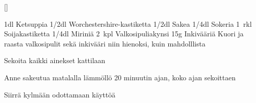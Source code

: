 []

\begin{step}
    1dl Ketsuppia
    1/2dl Worchestershire-kastiketta
    1/2dl Sakea
    1/4dl Sokeria
    1~rkl Soijakastiketta
    1/4dl Miriniä
    2~kpl Valkosipuliakynsi
    15g Inkivääriä
    \method
    Kuori ja raasta valkosipulit sekä inkivääri niin hienoksi, kuin mahdolllista

    Sekoita kaikki ainekset kattilaan

    Anne sakeutua matalalla lämmöllö 20 minuutin ajan, koko ajan sekoittaen

    Siirrä kylmään odottamaan käyttöä
\end{step}
